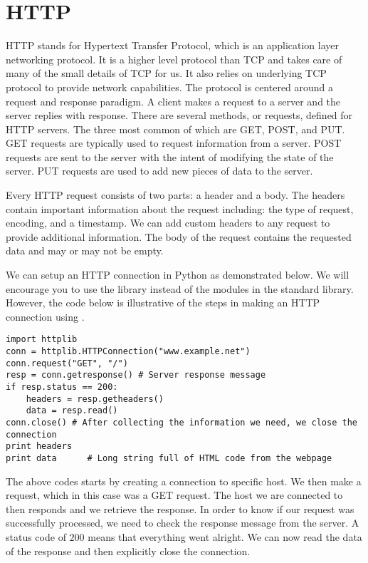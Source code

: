 \section*{HTTP} %

HTTP stands for Hypertext Transfer Protocol, which is an application layer networking protocol.
It is a higher level protocol than TCP and takes care of many of the small details of TCP for us.
It also relies on underlying TCP protocol to provide network capabilities.
The protocol is centered around a request and response paradigm.
A client makes a request to a server and the server replies with response.
There are several methods, or requests, defined for HTTP servers. The three most common of which are GET, POST, and PUT.
GET requests are typically used to request information from a server.
POST requests are sent to the server with the intent of modifying the state of the server.
PUT requests are used to add new pieces of data to the server.

Every HTTP request consists of two parts: a header and a body.
The headers contain important information about the request including: the type of request, encoding, and a timestamp.
We can add custom headers to any request to provide additional information.
The body of the request contains the requested data and may or may not be empty.

We can setup an HTTP connection in Python as demonstrated below.
We will encourage you to use the  library instead of the modules in the standard library.
However, the code below is illustrative of the steps in making an HTTP connection using .

\begin{lstlisting}
import httplib
conn = httplib.HTTPConnection("www.example.net")
conn.request("GET", "/")
resp = conn.getresponse() # Server response message
if resp.status == 200:
    headers = resp.getheaders()
    data = resp.read()
conn.close() # After collecting the information we need, we close the connection
print headers
print data      # Long string full of HTML code from the webpage
\end{lstlisting}

The above codes starts by creating a connection to specific host.
We then make a request, which in this case was a GET request.
The host we are connected to then responds and we retrieve the response.
In order to know if our request was successfully processed, we need to check the response message from the server.
A status code of $200$ means that everything went alright.
We can now read the data of the response and then explicitly close the connection.

